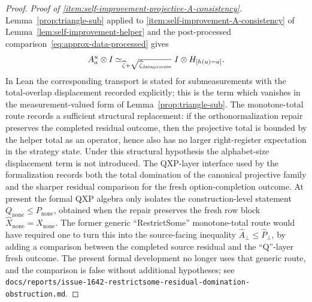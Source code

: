 \begin{proof}
  \emph{Proof of \ref{item:self-improvement-projective-A-consistency}.}
  Lemma~\ref{prop:triangle-sub} applied to \ref{item:self-improvement-A-consistency} of Lemma~\ref{lem:self-improvement-helper} and the post-processed comparison~\eqref{eq:approx-data-processed} gives
  \[
    A^u_a \otimes I \simeq_{\widehat{\zeta} + \sqrt{\widehat{\zeta}_{\mathrm{dataprocess}}}}
    I \otimes H_{[h(u) = a]}.
  \]
  In Lean the corresponding transport is stated for submeasurements with the
  total-overlap displacement recorded explicitly; this is the term which
  vanishes in the measurement-valued form of Lemma~\ref{prop:triangle-sub}.
  The monotone-total route records a sufficient structural replacement: if the
  orthonormalization repair preserves the completed residual outcome, then the
  projective total is bounded by the helper total as an operator, hence also
  has no larger right-register expectation in the strategy state.  Under this
  structural hypothesis the alphabet-size displacement term is not introduced.
  The QXP-layer interface used by the formalization records both the total
  domination of the canonical projective family and the sharper
  residual comparison for the fresh option-completion outcome.  At present the
  formal QXP algebra only isolates the construction-level statement
  \(Q_{\mathrm{none}} \leq P_{\mathrm{none}}\), obtained when the repair
  preserves the fresh row block \(\widehat X_{\mathrm{none}}=X_{\mathrm{none}}\).
  The former generic ``RestrictSome'' monotone-total route would have required
  one to turn this into the source-facing inequality
  \(\widehat A_{\bot} \leq \widehat P_{\bot}\), by adding a comparison between
  the completed source residual and the ``Q''-layer fresh outcome.  The present
  formal development no longer uses that generic route, and the comparison is
  false without additional hypotheses; see
  \texttt{docs/reports/issue-1642-restrictsome-residual-domination-obstruction.md}.

\end{proof}
